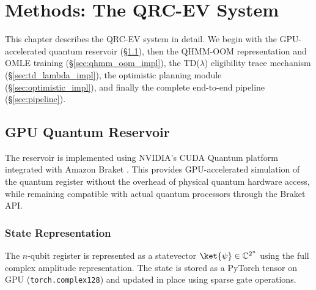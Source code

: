 
\chapter{Methods: The QRC-EV System}
\label{chap:methods}

This chapter describes the QRC-EV system in detail. We begin with the
GPU-accelerated quantum reservoir (\S\ref{sec:gpu_reservoir}), then the
QHMM-OOM representation and OMLE training (\S\ref{sec:qhmm_oom_impl}),
the TD($\lambda$) eligibility trace mechanism (\S\ref{sec:td_lambda_impl}),
the optimistic planning module (\S\ref{sec:optimistic_impl}), and finally
the complete end-to-end pipeline (\S\ref{sec:pipeline}).


\section{GPU Quantum Reservoir}
\label{sec:gpu_reservoir}


The reservoir is implemented using NVIDIA's CUDA Quantum platform
\citep{nvidiacudaq} integrated with Amazon Braket
\citep{amazonbraket}. This provides GPU-accelerated simulation of the
quantum register without the overhead of physical quantum hardware access,
while remaining compatible with actual quantum processors through the
Braket API.


\subsection{State Representation}

The $n$-qubit register is represented as a statevector
$\ket{\psi} \in \mathbb{C}^{2^n}$ using the full complex amplitude
representation. The state is stored as a PyTorch tensor on GPU
(\verb|torch.complex128|) and updated in place using sparse gate
operations.

